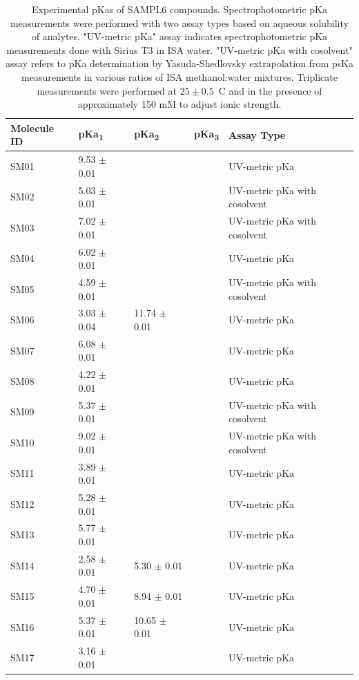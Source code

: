 \documentclass[9pt,lineno]{elife}
\begin{document}
\begin{table}[tb!]
\begin{center}
\begin{threeparttable}
\centering
\caption{Experimental pKas of SAMPL6 compounds. Spectrophotometric pKa measurements were performed with two assay types based on aqueous solubility of analytes. "UV-metric pKa" assay indicates spectrophotometric pKa measurements done with Sirius T3 in ISA water. "UV-metric pKa with cosolvent" assay refers to pKa determination by Yasuda-Shedlovsky extrapolation from psKa measurements in various ratios of ISA methanol:water mixtures. Triplicate measurements were performed at $25 \pm 0.5$~\textdegree C and in the presence of approximately 150 mM  to adjust ionic strength.} 
\label{my-label}
\begin{tabular}{@{}lllll@{}}
\toprule
Molecule ID & pKa\textsubscript{1} & pKa\textsubscript{2} & pKa\textsubscript{3} & Assay Type \\ \midrule
SM01 & 9.53 $\pm$ 0.01 &  &  & UV-metric pKa \\
SM02 & 5.03 $\pm$ 0.01 &  &  & UV-metric pKa with cosolvent \\
SM03 & 7.02 $\pm$ 0.01 &  &  & UV-metric pKa with cosolvent \\
SM04 & 6.02 $\pm$ 0.01 &  &  & UV-metric pKa \\
SM05 & 4.59 $\pm$ 0.01 &  &  & UV-metric pKa with cosolvent \\
SM06 & 3.03 $\pm$ 0.04 & 11.74 $\pm$ 0.01 &  & UV-metric pKa \\
SM07 & 6.08 $\pm$ 0.01 &  &  & UV-metric pKa \\
SM08 & 4.22 $\pm$ 0.01 &  &  & UV-metric pKa \\
SM09 & 5.37 $\pm$ 0.01 &  &  & UV-metric pKa with cosolvent \\
SM10 & 9.02 $\pm$ 0.01 &  &  & UV-metric pKa with cosolvent \\
SM11 & 3.89 $\pm$ 0.01 &  &  & UV-metric pKa \\
SM12 & 5.28 $\pm$ 0.01 &  &  & UV-metric pKa \\
SM13 & 5.77 $\pm$ 0.01 &  &  & UV-metric pKa \\
SM14 & 2.58 $\pm$ 0.01 & 5.30 $\pm$ 0.01 &  & UV-metric pKa \\
SM15 & 4.70 $\pm$ 0.01 & 8.94 $\pm$ 0.01 &  & UV-metric pKa \\
SM16 & 5.37 $\pm$ 0.01 & 10.65 $\pm$ 0.01 &  & UV-metric pKa \\
SM17 & 3.16 $\pm$ 0.01 &  &  & UV-metric pKa \\

\end{tabular}
\end{threeparttable}
\end{center}
\end{table}
\end{document}
